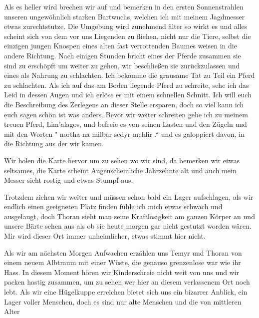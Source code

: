 \documentclass[11pt]{scrreprt}
\begin{document}
Als es heller wird brechen wir auf und bemerken in den ersten Sonnenstrahlen unseren ungewöhnlich starken Bartwuchs, welchen ich mit meinem Jagdmesser etwas zurechtstutze. Die Umgebung wird zunehmend älter so wirkt es und alles scheint sich von dem vor uns Liegenden zu fliehen, nicht nur die Tiere, selbst die einzigen jungen Knospen eines alten fast verrottenden Baumes weisen in die andere Richtung. Nach einigen Stunden bricht eines der Pferde zusammen sie
sind zu erschöpft um weiter zu gehen, wir beschließen sie zurückzulassen und eines als Nahrung zu schlachten. Ich bekomme die grausame Tat zu Teil ein Pferd zu schlachten. Als ich auf das am Boden liegende Pferd zu schreite, sehe ich das Leid in dessen Augen und ich erlöse es mit einem schnellen Schnitt. Ich will euch die Beschreibung des Zerlegens an dieser Stelle ersparen, doch so viel kann ich euch sagen schön ist was anders. Bevor wir weiter schreiten gehe ich zu meinem treuen Pferd, Lim'alagos, und befreie es von seinen Lasten und den Zügeln und mit den Worten
" northa na milbar sedyr meldir .“ und es galoppiert davon, in die Richtung aus der wir kamen.\par
Wir holen die Karte hervor um zu sehen wo wir sind, da bemerken wir etwas seltsames, die Karte scheint Augenscheinliche Jahrzehnte alt und auch mein Messer sieht rostig und etwas Stumpf aus.\par
Trotzdem ziehen wir weiter und müssen schon bald ein Lager aufschlagen, als wir endlich einen geeigneten Platz finden fühle ich mich etwas schwach und ausgelaugt, doch Thoran sieht man seine Kraftlosigkeit am ganzen Körper an und unsere Bärte sehen aus als ob sie heute morgen gar nicht gestutzt worden wären. Mir wird dieser Ort immer unheimlicher, etwas stimmt hier nicht.\par
Als wir am nächsten Morgen Aufwachen erzählen uns Temyr und Thoran von einem neuem Albtraum mit einer Wüste, die genauso grenzenlose war wie ihr Hass. In diesem Moment hören wir Kinderschreie nicht weit von uns und wir packen hastig zusammen, um zu sehen wer hier an diesem verlassenem Ort noch lebt. Als wir eine Hügelkuppe erreichen bietet sich uns ein bizarrer Anblick, ein Lager voller Menschen, doch es sind nur alte Menschen und die von mittleren Alter
\end{document}
